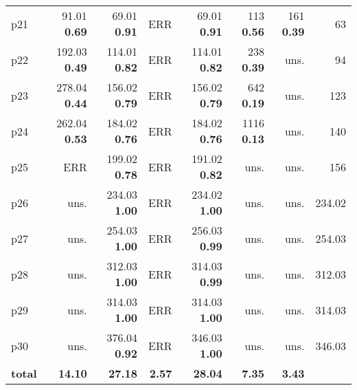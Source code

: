 \begin{tabular}{lrrrrrrr}
\multicolumn{1}{l|}{p21} & {\footnotesize 91.01} \textbf{0.69} & {\footnotesize 69.01} \textbf{0.91} & ERR & {\footnotesize 69.01} \textbf{0.91} & {\footnotesize 113} \textbf{0.56} & {\footnotesize 161} \textbf{0.39} & \multicolumn{1}{|r}{63}\\
\multicolumn{1}{l|}{p22} & {\footnotesize 192.03} \textbf{0.49} & {\footnotesize 114.01} \textbf{0.82} & ERR & {\footnotesize 114.01} \textbf{0.82} & {\footnotesize 238} \textbf{0.39} & uns. & \multicolumn{1}{|r}{94}\\
\multicolumn{1}{l|}{p23} & {\footnotesize 278.04} \textbf{0.44} & {\footnotesize 156.02} \textbf{0.79} & ERR & {\footnotesize 156.02} \textbf{0.79} & {\footnotesize 642} \textbf{0.19} & uns. & \multicolumn{1}{|r}{123}\\
\multicolumn{1}{l|}{p24} & {\footnotesize 262.04} \textbf{0.53} & {\footnotesize 184.02} \textbf{0.76} & ERR & {\footnotesize 184.02} \textbf{0.76} & {\footnotesize 1116} \textbf{0.13} & uns. & \multicolumn{1}{|r}{140}\\
\multicolumn{1}{l|}{p25} & ERR & {\footnotesize 199.02} \textbf{0.78} & ERR & {\footnotesize 191.02} \textbf{0.82} & uns. & uns. & \multicolumn{1}{|r}{156}\\
\multicolumn{1}{l|}{p26} & uns. & {\footnotesize 234.03} \textbf{1.00} & ERR & {\footnotesize 234.02} \textbf{1.00} & uns. & uns. & \multicolumn{1}{|r}{234.02}\\
\multicolumn{1}{l|}{p27} & uns. & {\footnotesize 254.03} \textbf{1.00} & ERR & {\footnotesize 256.03} \textbf{0.99} & uns. & uns. & \multicolumn{1}{|r}{254.03}\\
\multicolumn{1}{l|}{p28} & uns. & {\footnotesize 312.03} \textbf{1.00} & ERR & {\footnotesize 314.03} \textbf{0.99} & uns. & uns. & \multicolumn{1}{|r}{312.03}\\
\multicolumn{1}{l|}{p29} & uns. & {\footnotesize 314.03} \textbf{1.00} & ERR & {\footnotesize 314.03} \textbf{1.00} & uns. & uns. & \multicolumn{1}{|r}{314.03}\\
\multicolumn{1}{l|}{p30} & uns. & {\footnotesize 376.04} \textbf{0.92} & ERR & {\footnotesize 346.03} \textbf{1.00} & uns. & uns. & \multicolumn{1}{|r}{346.03}\\
\midrule
\textbf{total} & \textbf{14.10} & \textbf{27.18} & \textbf{2.57} & \textbf{28.04} & \textbf{7.35} & \textbf{3.43} & \\
\bottomrule
\end{tabular}

